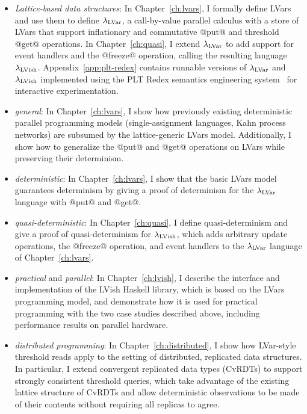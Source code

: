 \begin{itemize}
  \item \emph{Lattice-based data structures}: In
    Chapter~\ref{ch:lvars}, I formally define LVars and use them to
    define $\lambda_{\textrm{LVar}}$, a call-by-value parallel calculus with a
    store of LVars that support inflationary and commutative @put@ and threshold
    @get@ operations. In Chapter~\ref{ch:quasi}, I extend
    $\lambda_{\textrm{LVar}}$ to add support for event handlers 
    and the @freeze@ operation, calling the resulting
    language $\lambda_{\textrm{LVish}}$.  Appendix~\ref{app:plt-redex} contains
    runnable versions of $\lambda_{\textrm{LVar}}$ and $\lambda_{\textrm{LVish}}$ implemented
    using the PLT Redex semantics engineering system~\cite{redex-book}
    for interactive experimentation.

  \item \emph{general}: In Chapter~\ref{ch:lvars}, I show how
    previously existing deterministic parallel programming models
    (single-assignment languages, Kahn process networks) are subsumed
    by the lattice-generic LVars model.  Additionally, I show how to
    generalize the @put@ and @get@ operations on LVars while
    preserving their determinism.

  \item \emph{deterministic}: In Chapter~\ref{ch:lvars}, I show that
    the basic LVars model guarantees determinism by giving a proof of
    determinism for the $\lambda_{\textrm{LVar}}$ language with @put@ and @get@.

  \item \emph{quasi-deterministic}: In Chapter~\ref{ch:quasi}, I
    define quasi-determinism and give a proof of quasi-determinism for
    $\lambda_{\textrm{LVish}}$, which adds arbitrary update operations, the
    @freeze@ operation, and event handlers to the $\lambda_{\textrm{LVar}}$
    language of Chapter~\ref{ch:lvars}.

  \item \emph{practical} and \emph{parallel}: In
    Chapter~\ref{ch:lvish}, I describe the interface and
    implementation of the LVish Haskell library, which is based on the
    LVars programming model, and demonstrate how it is used for
    practical programming with the two case studies described above,
    including performance results on parallel hardware.


  \item \emph{distributed programming}: In
    Chapter~\ref{ch:distributed}, I show how LVar-style threshold
    reads apply to the setting of distributed, replicated data
    structures.  In particular, I extend convergent replicated data
    types (CvRDTs) to support strongly consistent threshold queries,
    which take advantage of the existing lattice structure of CvRDTs
    and allow deterministic observations to be made of their contents
    without requiring all replicas to agree.
\end{itemize}
\fi

